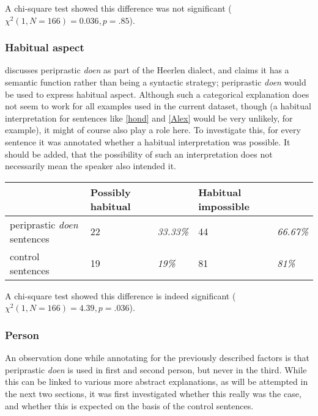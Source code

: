 \documentclass[12pt]{article}
\begin{document}
A chi-square test showed this difference was not significant ($\chi^2(1, N=166) = 0.036, p = .85$).


\subsubsection{Habitual aspect}

\citet{c94} discusses periprastic \emph{doen} as part of the Heerlen dialect, and claims it has a semantic function rather than being a syntactic strategy; periprastic \emph{doen} would be used to express habitual aspect. Although such a categorical explanation does not seem to work for all examples used in the current dataset, though (a habitual interpretation for sentences like \ref{hond} and \ref{Alex} would be very unlikely, for example), it might of course also play a role here. To investigate this, for every sentence it was annotated whether a habitual interpretation was possible. It should be added, that the possibility of such an interpretation does not necessarily mean the speaker also intended it.

\begin{table}[h]
\begin{tabular}{|l|ll|ll|}
\hline
&Possibly habitual&&Habitual impossible&\\
\hline
periprastic \emph{doen} sentences	&22 	& \emph{33.33\%}	&44		 &\emph{66.67\%}\\
control sentences					&19		& \emph{19\%}		&81		 &\emph{81\%}\\
\hline
\end{tabular}
\end{table}

A chi-square test showed this difference is indeed significant ($\chi^2(1, N=166) = 4.39, p = .036$).


\subsubsection{Person}

An observation done while annotating for the previously described factors is that periprastic \emph{doen} is used in first and second person, but never in the third. While this can be linked to various more abstract explanations, as will be attempted in the next two sections, it was first investigated whether this really was the case, and whether this is expected on the basis of the control sentences.
\end{document}
